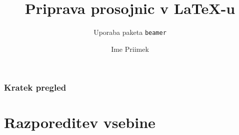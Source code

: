 \documentclass{beamer}
\begin{document}

\title{Priprava prosojnic v \LaTeX-u}
\subtitle{Uporaba paketa \texttt{beamer}}
\author{Ime Priimek}
\date{}

\begin{frame}
\titlepage
\end{frame}

\begin{frame}
   \frametitle{Kratek pregled}
    \tableofcontents[pausesections]
\end{frame}

\section{Razporeditev vsebine}
\end{document}
